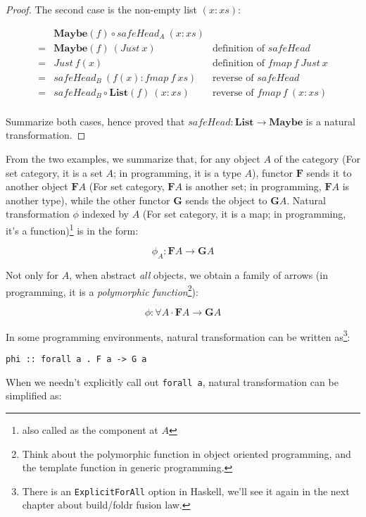 \documentclass{article}
\begin{document}
\begin{example}
\begin{proof}
The second case is the non-empty list $(x:xs)$:

\[
\begin{array}{cll}
  & \mathbf{Maybe}(f) \circ safeHead_A\ (x:xs) & \\
= & \mathbf{Maybe}(f)\ (Just\ x) & \text{definition of $safeHead$} \\
= & Just\ f(x) & \text{definition of $fmap\ f\ Just\ x$} \\
= & safeHead_B\ (f(x) : fmap\ f\ xs) & \text{reverse of $safeHead$} \\
= & safeHead_B \circ \mathbf{List}(f)\ (x:xs) & \text{reverse of $fmap\ f\ (x:xs)$} \\
\end{array}
\]

Summarize both cases, hence proved that $safeHead : \mathbf{List} \to \mathbf{Maybe}$ is a natural transformation.
\end{proof}
\end{example}

From the two examples, we summarize that, for any object $A$ of the category (For set category, it is a set $A$; in programming, it is a type $A$), functor $\mathbf{F}$ sends it to another object $\mathbf{F}A$ (For set category, $\mathbf{F}A$ is another set; in programming, $\mathbf{F}A$ is another type), while the other functor $\mathbf{G}$ sends the object to $\mathbf{G}A$. Natural transformation $\phi$ indexed by $A$ (For set category, it is a map; in programming, it's a function)\footnote{also called as the component at $A$} is in the form:

\[
\phi_A : \mathbf{F} A \to \mathbf{G} A
\]

Not only for $A$, when abstract {\em all} objects, we obtain a family of arrows (in programming, it is a {\em polymorphic function}\footnote{Think about the polymorphic function in object oriented programming, and the template function in generic programming.}):

\[
\phi : \forall A \cdot \mathbf{F} A \to \mathbf{G} A
\]

In some programming environments, natural transformation can be written as\footnote{There is an \texttt{ExplicitForAll} option in Haskell, we'll see it again in the next chapter about build/foldr fusion law.}:

\lstset{frame=single}
\begin{lstlisting}
phi :: forall a . F a -> G a
\end{lstlisting}

When we needn't explicitly call out \texttt{forall a}, natural transformation can be simplified as:
\end{document}
